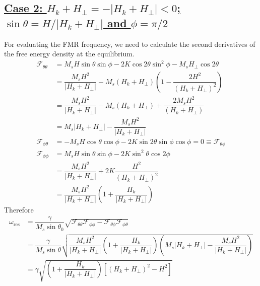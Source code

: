 \documentclass[aps,prb,onecolumn,notitlepage,showpacs,floatfix,superscriptaddress]{revtex4-1}
\newcommand{\mrm}[1]{\mathrm{#1}}
\newcommand{\sint}{\sin\theta}
\newcommand{\cost}{\cos\theta}
\newcommand{\sinp}{\sin \phi}
\newcommand{\cosp}{ \cos\phi}
\newcommand{\fe}{ \mathcal{F}}
\begin{document}
\subsection*{\underline{Case 2: $H_k+ H_{\perp} = - \vert H_k+ H_{\perp} \vert<0$; $\sint=H /\vert H_k+ H_{\perp}\vert$ and $\phi=\pi/2$}}
For evaluating the FMR frequency, we need to calculate the second derivatives of the free energy density at the equilibrium.
\begin{equation}
\begin{split}
\fe_{\theta \theta}  &=  M_s H \sint \sinp - 2 K \cos 2\theta \sin^2 \phi -M_s H_{\perp} \cos 2\theta  \\
&=  \dfrac{M_s H^2 }{\vert H_k+ H_{\perp}\vert} - M_s \left(H_k+H_\perp\right) \left( 1- \dfrac{2H^2}{(H_k+ H_{\perp})^2}\right) \\
&=  \dfrac{M_s H^2 }{\vert H_k+ H_{\perp}\vert} - M_s \left(H_k+H_\perp\right) + \dfrac{2M_s H^2}{(H_k+ H_{\perp})} \\
&=  M_s \vert H_k+H_\perp \vert - \dfrac{M_s H^2}{\vert H_k+ H_{\perp} \vert} \\
\fe_{\phi \theta}  &=  - M_s H \cost \cosp - 2 K \sin 2 \theta \sinp \cosp = 0  \equiv \fe_{\theta \phi} \\
\fe_{\phi \phi}  &=   M_s H \sint \sinp - 2 K \sin^2 \theta \cos 2\phi \\
&=  \dfrac{M_s H^2}{\vert H_k+ H_{\perp}\vert}  + 2 K \dfrac{H^2}{(H_k+ H_{\perp})^2}\\
&=  \dfrac{M_s H^2}{\vert H_k+ H_{\perp}\vert} \left(1  +  \dfrac{H_k}{\vert H_k+ H_{\perp}\vert} \right)
\end{split}
\end{equation}
Therefore
\begin{equation}
\begin{split}
\omega_\mrm{res} &=  \dfrac{\gamma}{M_s \sint_0} \sqrt{\fe_{\theta \theta} \fe_{\phi \phi}-  \fe_{\theta \phi}\fe_{\phi \theta}}\\
&= \dfrac{\gamma}{M_s \sint} \sqrt{ \dfrac{M_s H^2}{\vert H_k+ H_{\perp}\vert} \left(1  +  \dfrac{H_k}{\vert H_k+ H_{\perp}\vert} \right)\left( M_s \vert H_k+H_\perp \vert - \dfrac{M_s H^2}{\vert H_k+ H_{\perp} \vert} \right)} \\
&= \gamma \sqrt{ \left(1  +  \dfrac{H_k}{\vert H_k+ H_{\perp}\vert} \right)\left[  ( H_k+H_\perp )^2 - H^2 \right]} \\
\end{split}
\end{equation}
\end{document}
